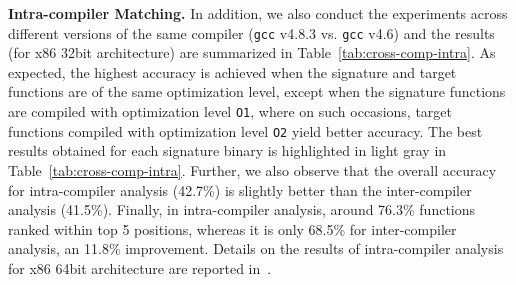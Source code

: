 \noindent\textbf{Intra-compiler Matching.} In addition, we also conduct the experiments across different versions of the same compiler (\texttt{gcc} v4.8.3 vs. \texttt{gcc} v4.6) and the results (for x86 32bit architecture) are summarized in Table~\ref{tab:cross-comp-intra}.
As expected, the highest accuracy is achieved when the signature and target functions are of the same optimization level, except when the signature functions are compiled with optimization level \texttt{O1}, where on such occasions, target functions compiled with optimization level \texttt{O2} yield better accuracy. The best results obtained for each signature binary is highlighted in light gray in Table~\ref{tab:cross-comp-intra}.
Further, we also observe that the overall accuracy for intra-compiler analysis (42.7\%) is slightly better than the inter-compiler analysis (41.5\%). %
Finally, in intra-compiler analysis, around 76.3\% functions ranked within top 5 positions, whereas it is only 68.5\% for inter-compiler analysis, an 11.8\% improvement. Details on the results of intra-compiler analysis for x86 64bit architecture are reported in~\cite{bingo@fse2016}.

